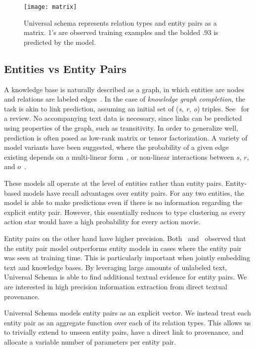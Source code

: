 \begin{figure}[h]
\caption{Universal schema represents relation types and entity pairs as a matrix.
1's are observed training examples and the bolded .93 is predicted by the model.
\label{fig:uschema-matrix}}
\centering
\texttt{[image: matrix]}
\end{figure}



\subsection {Entities vs Entity Pairs}

A knowledge base is naturally described as a graph, in which entities are nodes and relations are labeled edges~\citep{yago,freebase}.
In the case of \emph{knowledge graph completion}, the task is akin to link prediction, assuming an initial set of (\emph{s, r, o}) triples.
See~\citet{nickel2015review} for a review.
No accompanying text data is necessary, since links can be predicted using properties of the graph, such as transitivity.
In order to generalize well, prediction is often posed as low-rank matrix or tensor factorization.
A variety of model variants have been suggested, where the probability of a given edge existing depends on a multi-linear form~\citep{rescal,DBLP:journals/corr/Garcia-DuranBUG15,bishan,transe,wang2014knowledge,lin2015learning}, or non-linear interactions between $s$, $r$, and $o$~\citep{socherkb}.

These models all operate at the level of entities rather than entity pairs.
Entity-based models have recall advantages over entity pairs.
For any two entities, the model is able to make predictions even if there is no information regarding the explicit entity pair.
However, this essentially reduces to type clustering as every action star would have a high probability for every action movie.

Entity pairs on the other hand have higher precision.
Both~\citet{toutanova2015representing} and~\citet{limin} observed that the entity pair model outperforms entity models in cases where the entity pair was seen at training time.
This is particularly important when jointly embedding text and knowledge bases.
By leveraging large amounts of unlabeled text, Universal Schema is able to find additional textual evidence for entity pairs.
We are interested in high precision information extraction from direct textual provenance.

Universal Schema models entity pairs  as an explicit vector.
We instead treat each entity pair as an aggregate function over each of its relation types.
This allows us to trivially extend to unseen entity pairs, have a direct link to provenance, and allocate a variable number of parameters per entity pair.


